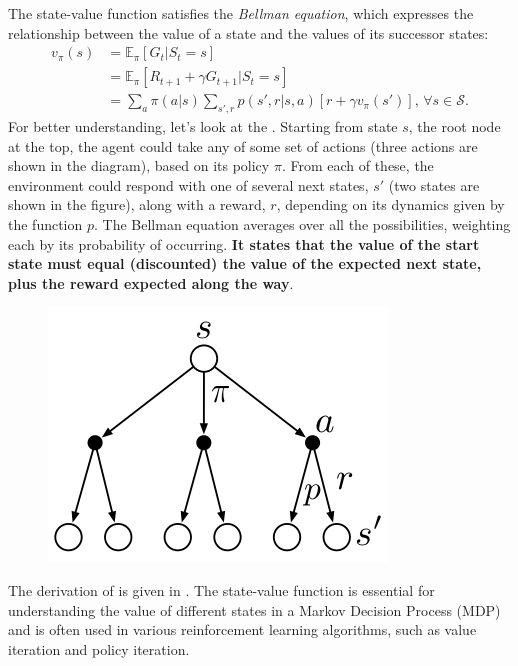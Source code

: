 The state-value function satisfies the \textit{Bellman equation}, which expresses the relationship between the value of a state and the values of its successor states:
\begin{align}
	v_\pi(s) &= \mathbb{E}_\pi[G_t|S_t=s]\\
	& = \mathbb{E}_\pi[R_{t+1} + \gamma G_{t+1}|S_t=s]\\
	& = \sum_{a}\pi(a|s)\sum_{s',r}p(s',r|s,a)[r + \gamma v_\pi(s')],\, \forall s \in \mathcal{S}.
	\label{eq:state_value_bellman}
\end{align}
For better understanding, let's look at the . Starting from state $s$, the root node at the top, the agent could take any of some set of actions (three actions are shown in the diagram), based on its policy $\pi$. From each of these, the environment could respond with one of several next states, $s'$ (two states are shown in the figure), along with a reward, $r$, depending on its dynamics given by the function $p$. The Bellman equation averages over all the possibilities, weighting each by its probability of occurring. \textbf{It states that the value of the start state must equal (discounted) the value of the expected next state, plus the reward expected along the way}. 
\begin{figure}[h]
	\centering
	\includegraphics[scale=0.3]{./images/backup_vpi.png}
	\label{fig:state_value_diagram}
\end{figure}
The derivation of  is given in . The state-value function is essential for understanding the value of different states in a Markov Decision Process (MDP) and is often used in various reinforcement learning algorithms, such as value iteration and policy iteration.

